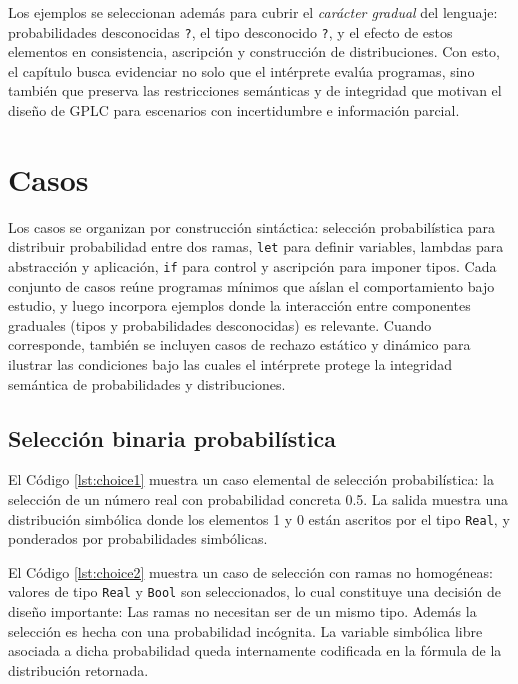Los ejemplos se seleccionan además para cubrir el \emph{carácter
  gradual} del lenguaje: probabilidades desconocidas \verb|?|, el tipo
desconocido \verb|?|, y el efecto de estos elementos en consistencia,
ascripción y construcción de distribuciones. Con esto, el capítulo
busca evidenciar no solo que el intérprete evalúa programas, sino
también que preserva las restricciones semánticas y de integridad que
motivan el diseño de GPLC para escenarios con incertidumbre e
información parcial.



\section{Casos}

Los casos se organizan por construcción sintáctica: selección
probabilística para distribuir probabilidad entre dos ramas,
\lstinline|let| para definir variables, lambdas para abstracción y
aplicación, \lstinline|if| para control y ascripción para imponer
tipos. Cada conjunto de casos reúne programas mínimos que aíslan el
comportamiento bajo estudio, y luego incorpora ejemplos donde la
interacción entre componentes graduales (tipos y probabilidades
desconocidas) es relevante. Cuando corresponde, también se incluyen
casos de rechazo estático y dinámico para ilustrar las condiciones
bajo las cuales el intérprete protege la integridad semántica de
probabilidades y distribuciones.

\subsection{Selección binaria probabilística} El Código
\ref{lst:choice1} muestra un caso elemental de selección
probabilística: la selección de un número real con probabilidad
concreta 0.5. La salida muestra una distribución simbólica donde los
elementos 1 y 0 están ascritos por el tipo \lstinline|Real|, y
ponderados por probabilidades simbólicas.






El Código \ref{lst:choice2} muestra un caso de selección con ramas
no homogéneas: valores de tipo \lstinline|Real| y \lstinline|Bool| son
seleccionados, lo cual constituye una decisión de diseño importante:
Las ramas no necesitan ser de un mismo tipo. Además la selección es
hecha con una probabilidad incógnita. La variable simbólica libre
asociada a dicha probabilidad queda internamente codificada en la
fórmula de la distribución retornada.

